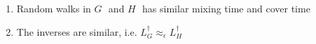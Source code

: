 \documentclass[12pt]{beamer}
\def\eps{\epsilon}
\renewcommand\AA{\boldsymbol{\mathit{A}}}
\newcommand\BB{\boldsymbol{\mathit{B}}}
\newcommand\CC{\boldsymbol{\mathit{C}}}
\newcommand\DD{\boldsymbol{\mathit{D}}}
\newcommand\LL{\boldsymbol{\mathit{L}}}
\newcommand\VV{\boldsymbol{\mathit{V}}}
\begin{document}
\begin{spacing}{1.3}
{\begin{itemize}
\begin{enumerate}
					are similar
				\item Random walks in \scriptsize$G$\,\footnotesize\ and \scriptsize$H$\,\footnotesize\ 
					has similar mixing time and cover time
				\item The inverses are similar, i.e. \scriptsize$\LL_G^\dag \approx_{\eps} \LL_H^\dag$\,\footnotesize\
			\end{enumerate}
	\end{itemize}
}


\end{spacing}
\end{document}
